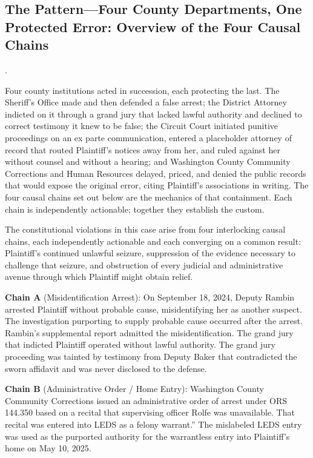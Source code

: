 \documentclass[12pt,letterpaper]{article}
\newcounter{complaintpara}
\newenvironment{paras}{%
	\begin{list}{\arabic{complaintpara}.}{%
			\setlength{\leftmargin}{0.5in}%
			\setlength{\labelwidth}{0.4in}%
			\setlength{\labelsep}{0.1in}%
			\setlength{\itemsep}{0pt}%
			\setlength{\parsep}{0pt}%
			\setlength{\topsep}{6pt}%
		}%
	}{%
	\end{list}%
}
\begin{document}
	\subsection*{The Pattern---Four County Departments, One Protected Error: Overview of the Four Causal Chains}
	\begin{paras}
		
		\item Four county institutions acted in succession, each protecting the last. The Sheriff's Office made and then defended a false arrest; the District Attorney indicted on it through a grand jury that lacked lawful authority and declined to correct testimony it knew to be false; the Circuit Court initiated punitive proceedings on an ex parte communication, entered a placeholder attorney of record that routed Plaintiff's notices away from her, and ruled against her without counsel and without a hearing; and Washington County Community Corrections and Human Resources delayed, priced, and denied the public records that would expose the original error, citing Plaintiff's associations in writing. The four causal chains set out below are the mechanics of that containment. Each chain is independently actionable; together they establish the custom.
		
		\item\label{fact:overview} The constitutional violations in this
		case arise from four interlocking causal chains, each
		independently actionable and each converging on a common
		result: Plaintiff's continued unlawful seizure, suppression of
		the evidence necessary to challenge that seizure, and
		obstruction of every judicial and administrative avenue through
		which Plaintiff might obtain relief.
		
		\item\label{fact:chain-a-intro} \textbf{Chain A} (Misidentification
		Arrest): On September 18, 2024, Deputy Rambin arrested
		Plaintiff without probable cause, misidentifying her as another
		suspect. The investigation purporting to supply probable cause
		occurred after the arrest. Rambin's supplemental report
		admitted the misidentification. The grand jury that indicted
		Plaintiff operated without lawful authority. The grand jury
		proceeding was tainted by testimony from Deputy Baker that
		contradicted the sworn affidavit and was never disclosed to
		the defense.
		
		\item\label{fact:chain-b-intro} \textbf{Chain B} (Administrative
		Order / Home Entry): Washington County Community Corrections
		issued an administrative order of arrest under ORS 144.350
		based on a recital that supervising officer Rolfe was
		unavailable. That recital was entered into LEDS as a felony
		warrant.'' The mislabeled LEDS entry was used as the purported
		authority for the warrantless entry into Plaintiff's home on
		May 10, 2025.
		

\end{paras}
\end{document}
